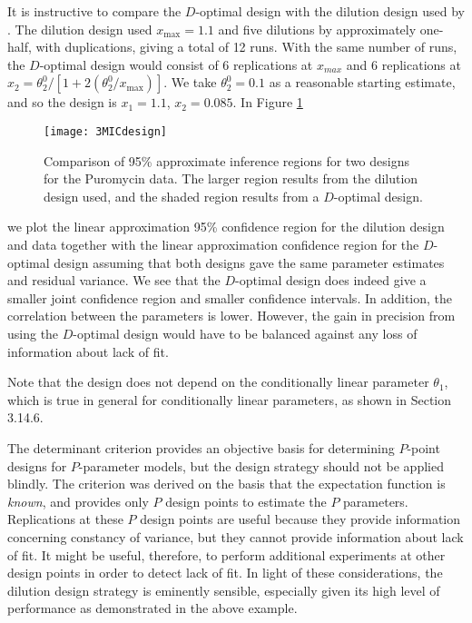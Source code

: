 \begin{example}
It is instructive to compare the $D$-optimal design with the
dilution design used by .
The dilution design used $x_{\text{max}}=1.1$ and five dilutions by
approximately one-half, with duplications, giving a total of 12 runs.
With the same number of runs, the $D$-optimal design would consist of 6
replications at $x_{max}$ and 6 replications at
$x_2=\theta_2^0 /[1+2 ( \theta_2^0 / x_{\text{max}})]$.
We take $\theta_2^0  =  0.1$ as a reasonable starting estimate,
and so the design is $x_1  =  1.1$, $x_2  =  0.085$.
In Figure \ref{fig:MICdesign}
\begin{figure}
  \centerline{\texttt{[image: 3MICdesign]}}%
  \caption{Comparison of 95\% approximate inference regions for two
    designs for the Puromycin data.  The larger region results from
    the dilution design used, and the shaded region results from a
    $D$-optimal design.}
  \label{fig:MICdesign}
\end{figure}
we plot the linear approximation 95\% confidence
region for the dilution design and data together with the linear
approximation confidence region for the $D$-optimal design assuming that
both designs gave the same parameter estimates and residual variance.
We see that the $D$-optimal design does indeed give a smaller joint
confidence region and smaller confidence intervals.
In addition, the correlation between the parameters is lower.
However, the gain in precision from using the $D$-optimal design would
have to be balanced against any loss of information about lack of fit.

Note that the design does not depend on the conditionally linear
parameter $\theta_{1}$, which is true in general for conditionally
linear parameters, as shown in Section 3.14.6.
\end{example}

The determinant criterion provides an objective basis for
determining $P$-point designs for $P$-parameter models, but the
design strategy should not be applied blindly.
The criterion was derived on the basis that the expectation
function is \emph{known}, and provides only $P$ design points to
estimate the $P$ parameters.
Replications at these $P$ design points are useful because
they provide information concerning constancy of
variance, but they cannot provide information about lack of fit.
It might be useful, therefore, to perform additional experiments
at other design points in order to detect lack of fit.
In light of these considerations, the dilution design strategy is
eminently sensible, especially given its high level of performance
as demonstrated in the above example.

